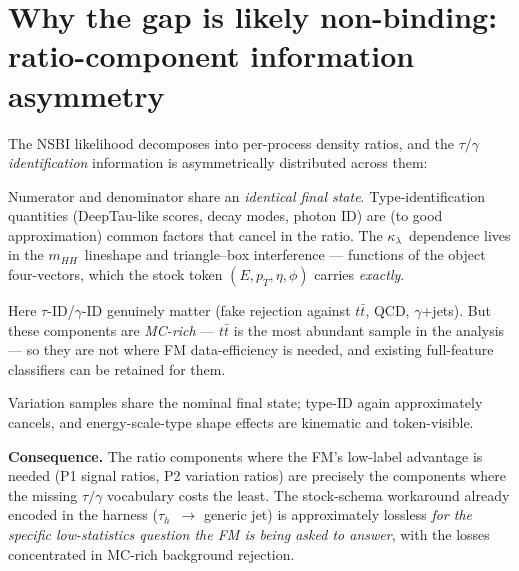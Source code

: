 \documentclass[11pt]{article}
\newcommand{\kl}{\ensuremath{\kappa_\lambda}}
\newcommand{\tauh}{\ensuremath{\tau_h}}
\newcommand{\mhh}{\ensuremath{m_{HH}}}
\begin{document}
\section{Why the gap is likely non-binding: ratio-component information asymmetry}
\label{sec:asymmetry}

The NSBI likelihood decomposes into per-process density ratios, and the
$\tau/\gamma$ \emph{identification} information is asymmetrically distributed
across them:

\begin{description}[leftmargin=2.2em]
\item[Signal--signal ratios $r(x;\kl,\kl')$.] Numerator and denominator
  share an \emph{identical final state}. Type-identification quantities
  (DeepTau-like scores, decay modes, photon ID) are (to good approximation)
  common factors that cancel in the ratio. The \kl\ dependence lives in the
  \mhh\ lineshape and triangle--box interference --- functions of the object
  four-vectors, which the stock token $(E,p_T,\eta,\phi)$ carries
  \emph{exactly}.
\item[Signal-vs-background discriminators.] Here $\tau$-ID/$\gamma$-ID
  genuinely matter (fake rejection against $t\bar t$, QCD, $\gamma$+jets).
  But these components are \emph{MC-rich} --- $t\bar t$ is the most abundant
  sample in the analysis --- so they are not where FM data-efficiency is
  needed, and existing full-feature classifiers can be retained for them.
\item[Systematic-variation ratios (nominal/varied, P2).] Variation samples
  share the nominal final state; type-ID again approximately cancels, and
  energy-scale-type shape effects are kinematic and token-visible.
\end{description}

\noindent\textbf{Consequence.} The ratio components where the FM's low-label
advantage is needed (P1 signal ratios, P2 variation ratios) are precisely the
components where the missing $\tau/\gamma$ vocabulary costs the least. The
stock-schema workaround already encoded in the harness (\tauh\ $\to$ generic
jet) is approximately lossless \emph{for the specific low-statistics question
the FM is being asked to answer}, with the losses concentrated in MC-rich
background rejection.
\end{document}
